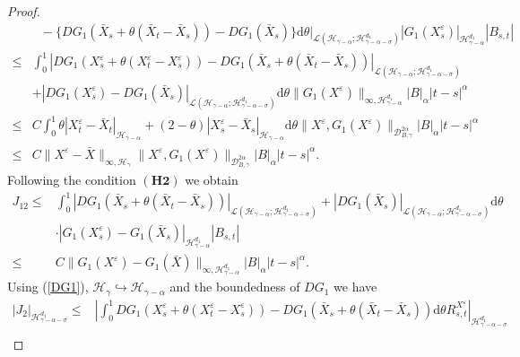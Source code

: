 \documentclass[10pt,a4paper]{amsart}
\begin{document}
\begin{proof}
\begin{align}
		&~~~-\{ DG_1(\bar{X}_s+\theta (\bar{X}_t-\bar{X}_s))-DG_1(\bar{X}_s)\} \mathrm{d} \theta \bigg|_{\mathcal L(\mathcal H_{\gamma-\alpha};\mathcal H_{\gamma-\alpha-\sigma}^{d_1})} |G_1(X_s^\varepsilon)|_{\mathcal H_{\gamma-\alpha}^{d_1} }  |B_{s,t}|   \nonumber\\	
		\leq &  \int_0^1 | DG_1(X_s^\varepsilon+\theta (X_t^\varepsilon-X_s^\varepsilon))-DG_1(\bar{X}_s+\theta (\bar{X}_t-\bar{X}_s)) |_{\mathcal L(\mathcal H_{\gamma-\alpha};\mathcal H_{\gamma-\alpha-\sigma}^{d_1}) }  \nonumber\\
		&+|DG_1(X_s^\varepsilon)-DG_1(\bar{X}_s) |_{\mathcal L(\mathcal H_{\gamma-\alpha};\mathcal H_{\gamma-\alpha-\sigma}^{d_1}) } \mathrm{d} \theta
		\|G_1(X^\varepsilon)\|_{\infty, \mathcal H_{\gamma-\alpha}^{d_1}}  |B|_{\alpha}  |t-s|^\alpha   \nonumber\\	
		\leq & C \int_0^1 \theta |X_t^\varepsilon-\bar{X}_t|_{\mathcal H_{\gamma-\alpha}}
		+(2-\theta) |X_s^\varepsilon-\bar{X}_s|_{\mathcal H_{\gamma-\alpha}} \mathrm{d} \theta  \|X^\varepsilon, G_1(X^\varepsilon)\|_{\mathcal{D}_{ B,\gamma}^{2\alpha}}
		|B|_{\alpha}  |t-s|^\alpha   \nonumber\\
		\leq & C \|X^\varepsilon-\bar{X}\|_{\infty, \mathcal H_{\gamma}}
		\|X^\varepsilon, G_1(X^\varepsilon)\|_{\mathcal{D}_{ B,\gamma}^{2\alpha}}
		|B|_{\alpha}  |t-s|^\alpha   .
	\end{align}
	Following the condition $(\mathbf{H2})$ we obtain
	\begin{align}\label{J12}
	J_{12} \leq & \int_0^1 |DG_1(\bar{X}_s+\theta (\bar{X}_t-\bar{X}_s))|_{\mathcal L(\mathcal H_{\gamma-\alpha};\mathcal H_{\gamma-\alpha-\sigma}^{d_1}) } +|DG_1(\bar{X}_s)|_{\mathcal L(\mathcal H_{\gamma-\alpha};\mathcal H_{\gamma-\alpha-\sigma}^{d_1}) } \mathrm{d} \theta \nonumber\\
		& \cdot |G_1(X_s^\varepsilon)-G_1(\bar{X}_s)|_{\mathcal H_{\gamma-\alpha}^{d_1}} |B_{s,t}|  \nonumber\\
		\leq & C \|G_1(X^\varepsilon)-G_1(\bar{X})\|_{\infty, \mathcal H_{\gamma-\alpha}^{d_1} } |B|_\alpha |t-s|^\alpha.
	\end{align}
	Using (\ref{DG1}), $\mathcal H_\gamma \hookrightarrow \mathcal H_{\gamma-\alpha}$ and the boundedness of $DG_1$ we have
	\begin{align}\label{remJ2}
		|J_2 |_{\mathcal H_{\gamma-\alpha-\sigma}^{d_1} }
		\leq & \left|\int_0^1 DG_1(X_s^\varepsilon+\theta (X_t^\varepsilon-X_s^\varepsilon))-DG_1(\bar{X}_s+\theta (\bar{X}_t-\bar{X}_s)) \mathrm{d} \theta R_{s,t}^{X^\varepsilon} \right|_{\mathcal H_{\gamma-\alpha-\sigma}^{d_1} } \nonumber\\

\end{align}
\end{proof}
\end{document}
